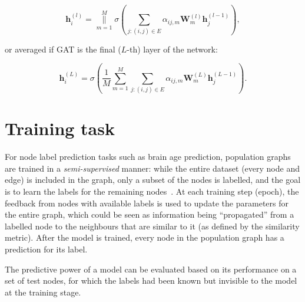 \begin{equation}
    \mathbf{h}_i^{(l)} = \underset{m=1}{\overset{M}{\big\|}} \sigma\left(\sum\limits_{j: (i,j)\in E} \alpha_{ij, m}\mathbf{W}^{(l)}_m\mathbf{h}_j^{(l-1)}\right),
\end{equation}

or averaged if GAT is the final ($L$-th) layer of the network:

\begin{equation}
    \mathbf{h}_i^{(L)} = \sigma\left(\frac{1}{M}\sum\limits_{m=1}^M\sum\limits_{j: (i,j)\in E} \alpha_{ij, m}\mathbf{W}^{(L)}_m\mathbf{h}_j^{(L-1)}\right).
\end{equation}

\section{Training task}
\label{training-task}


For node label prediction tasks such as brain age prediction, population graphs are trained in a \textit{semi-supervised} manner: while the entire dataset (every node and edge) is included in the graph, only a subset of the nodes is labelled, and the goal is to learn the labels for the remaining nodes~\cite{kipf2017semi}. At each training step (epoch), the feedback from nodes with available labels is used to update the parameters for the entire graph, which could be seen as information being ``propagated'' from a labelled node to the neighbours that are similar to it (as defined by the similarity metric). After the model is trained, every node in the population graph has a prediction for its label. 

The predictive power of a model can be evaluated based on its performance on a set of test nodes, for which the labels had been known but invisible to the model at the training stage.



